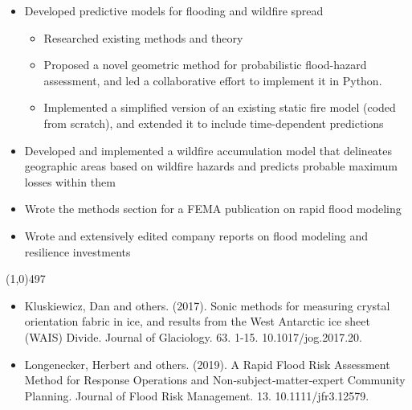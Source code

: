 \documentclass[10pt]{article} %
\begin{document}
\begin{small}
\begin{itemize}[leftmargin = .35in, 	noitemsep]
\item Developed predictive models for flooding and wildfire spread
\begin{itemize}[leftmargin = .3in, 	noitemsep]
\item Researched existing methods and theory
\item Proposed a novel geometric method for probabilistic flood-hazard assessment, and led a collaborative effort to implement it in Python.
\item Implemented a simplified version of an existing static fire model (coded from scratch), and extended it to include time-dependent predictions
\end{itemize}
\item Developed and implemented a wildfire accumulation model that delineates geographic areas based on wildfire hazards and predicts probable maximum losses within them
\item Wrote the methods section for a FEMA publication on rapid flood modeling
\item Wrote and extensively edited company reports on flood modeling and resilience investments
\end{itemize}

\vspace{-2mm}
\noindent
\line(1,0){497}\\
\vspace{-4mm}

\begin{itemize}
\item Kluskiewicz, Dan and others. (2017). Sonic methods for measuring crystal orientation fabric in ice, and results from the West Antarctic ice sheet (WAIS) Divide. Journal of Glaciology. 63. 1-15. 10.1017/jog.2017.20. 
\item Longenecker, Herbert and others. (2019). A Rapid Flood Risk Assessment Method for Response Operations and Non‐subject‐matter‐expert Community Planning. Journal of Flood Risk Management. 13. 10.1111/jfr3.12579. 
\end{itemize}

\end{small}
\end{document}
